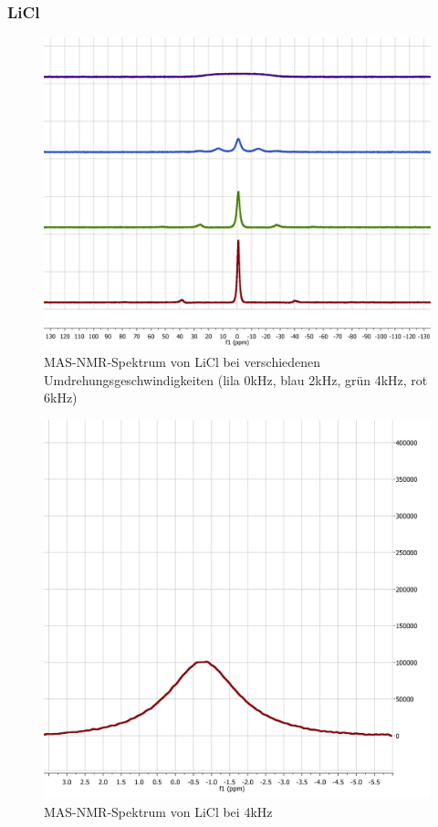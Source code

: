 \documentclass[a4paper, 11pt, headsepline,footsepline,twoside,abstract]{scrbook}
\begin{document}
\subsubsection{LiCl}
\begin{figure}
	\centering
	\includegraphics[width=1.0\columnwidth]{images/Spektrum_LiCl.png}
	\caption{MAS-NMR-Spektrum von LiCl bei verschiedenen Umdrehungsgeschwindigkeiten (lila 0kHz, blau 2kHz, grün 4kHz, rot 6kHz)}
	\label{nmr_mas_LiCl}
\end{figure}
\begin{figure}
	\centering
	\includegraphics[width=1.0\columnwidth]{images/LiCl.png}
	\caption{MAS-NMR-Spektrum von LiCl bei 4kHz}
	\label{nmr_mas_LATP2}
\end{figure}
\newpage
\end{document}
